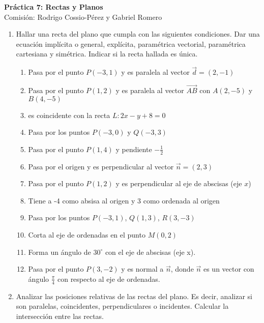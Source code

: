 \documentclass[a4paper]{article}
\newcommand{\exercise}{\item}
\begin{document}
\noindent \hrulefill 
\vspace{-7pt}
\begin{center} 
	\textbf{ Práctica 7: Rectas y Planos } \\
	Comisión: Rodrigo Cossio-Pérez y Gabriel Romero
\end{center}
\vspace{-10pt}
\hrulefill
\begin{enumerate}
	\exercise Hallar una recta del plano que cumpla con las siguientes condiciones. Dar una ecuación implícita o general, explícita, paramétrica vectorial, paramétrica cartesiana y simétrica. Indicar si la recta hallada es única.
	\begin{enumerate} [label=(\alph*)]
		\item Pasa por el punto $P(-3,1)$ y es paralela al vector $\vec{d}=(2,-1)$
		\item Pasa por el punto $P(1,2)$ y es paralela al vector $\overrightarrow{AB}$ con $A(2,-5)$ y $B(4,-5)$
		\item es coincidente con la recta $L: 2x-y+8=0$
		\item Pasa por los puntos $P(-3,0)$ y $Q(-3,3)$
		\item Pasa por el punto $P(1,4)$ y pendiente $\displaystyle{-\frac{1}{2}}$
		\item Pasa por el origen y es perpendicular al vector $\vec{n}=(2,3)$
		\item Pasa por el punto $P(1,2)$ y es perpendicular al eje de abscisas (eje $x$)
		\item Tiene a -4 como absisa al origen y 3 como ordenada al origen
		\item Pasa por los puntos $P(-3,1)$, $Q(1,3)$, $R(3,-3)$
		\item Corta al eje de ordenadas en el punto $M(0,2)$
		\item Forma un ángulo de $30^{\circ}$ con el eje de abscisas (eje x).
		\item Pasa por el punto $P(3,-2)$ y es normal a $\vec{n}$, donde $\vec{n}$ es un vector con ángulo $\displaystyle\frac{\pi}{4}$ con respecto al eje de ordenadas.
	\end{enumerate}
	\exercise Analizar las posiciones relativas de las rectas del plano. Es decir, analizar si son paralelas, coincidentes, perpendiculares o incidentes. Calcular la intersección entre las rectas.
	\begin{enumerate} [label=(\alph*)]

\end{enumerate}
\end{enumerate}
\end{document}
